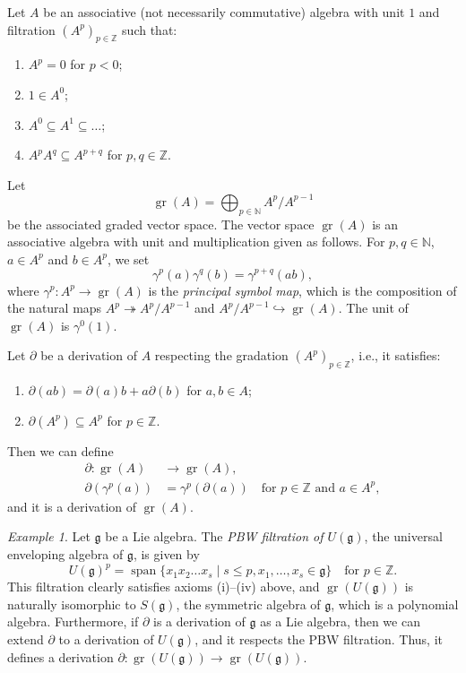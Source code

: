 \documentclass[a4paper, 12pt, reqno]{amsart}
\theoremstyle{remark}
\newtheorem{example}[theorem]{Example}
\DeclareMathOperator{\gr}{gr}
\DeclareMathOperator{\vspan}{span}
\begin{document}
Let $A$ be an associative (not necessarily commutative) algebra with unit $1$ and filtration $(A^p)_{p \in \mathbb{Z}}$ such that:
\begin{enumerate}
\item $A^p = 0$ for $p < 0$;
\item $1 \in A^0$;
\item $A^0 \subseteq A^1 \subseteq \dots$;
\item $A^pA^q \subseteq A^{p + q}$ for $p, q \in \mathbb{Z}$.
\end{enumerate}
Let
\begin{equation*}
  \gr(A) = \bigoplus_{p \in \mathbb{N}}A^p/A^{p - 1}
\end{equation*}
be the associated graded vector space.
The vector space $\gr(A)$ is an associative algebra with unit and multiplication given as follows.
For $p, q \in \mathbb{N}$, $a \in A^p$ and $b \in A^p$, we set
\begin{equation*}
  \gamma^p(a)\gamma^q(b) = \gamma^{p + q}(ab),
\end{equation*}
where $\gamma^p: A^p \to \gr(A)$ is the \emph{principal symbol map}, which is the composition of the natural maps $A^p \twoheadrightarrow A^p/A^{p - 1}$ and $A^p/A^{p - 1} \hookrightarrow \gr(A)$.
The unit of $\gr(A)$ is $\gamma^0(1)$.

Let $\partial$ be a derivation of $A$ respecting the gradation $(A^p)_{p \in \mathbb{Z}}$, i.e., it satisfies:
\begin{enumerate}
\item $\partial(ab) = \partial(a)b + a\partial(b)$ for $a, b \in A$;
\item $\partial(A^p) \subseteq A^p$ for $p \in \mathbb{Z}$.
\end{enumerate}
Then we can define
\begin{align*}
  \partial: \gr(A) &\to \gr(A), \\
  \partial(\gamma^p(a)) &= \gamma^p(\partial(a)) \quad \text{for $p \in \mathbb{Z}$ and $a \in A^p$},
\end{align*}
and it is a derivation of $\gr(A)$.

\begin{example}
  \label{exa:1}
  Let $\mathfrak{g}$ be a Lie algebra.
  The \emph{PBW filtration of $U(\mathfrak{g})$}, the universal enveloping algebra of $\mathfrak{g}$, is given by
  \begin{equation*}
    U(\mathfrak{g})^p = \vspan\{x_1x_2\dots x_s \mid s \le p, x_1, \dots, x_s \in \mathfrak{g}\} \quad \text{for $p \in \mathbb{Z}$}.
  \end{equation*}
  This filtration clearly satisfies axioms (i)--(iv) above, and $\gr(U(\mathfrak{g}))$ is naturally isomorphic to $S(\mathfrak{g})$, the symmetric algebra of $\mathfrak{g}$, which is a polynomial algebra.
  Furthermore, if $\partial$ is a derivation of $\mathfrak{g}$ as a Lie algebra, then we can extend $\partial$ to a derivation of $U(\mathfrak{g})$, and it respects the PBW filtration.
  Thus, it defines a derivation $\partial: \gr(U(\mathfrak{g})) \to \gr(U(\mathfrak{g}))$.
\end{example}
\end{document}
